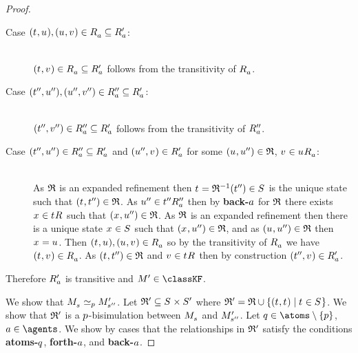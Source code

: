 \begin{proof}
\begin{description}
    \item[Case $(\kStateT, \kStateU), (\kStateU, \kStateV) \in \kAccessibilityA \subseteq \kAccessibilityPA$:] \hfill\\
        $(\kStateT, \kStateV) \in \kAccessibilityA \subseteq \kAccessibilityPA$ follows from the transitivity of $\kAccessibilityA$.
    \item[Case $({t}^{\prime\prime}, {u}^{\prime\prime}), ({u}^{\prime\prime}, {v}^{\prime\prime}) \in {R^{\prime\prime}_{a}} \subseteq {R^{\prime}_{a}}$:] \hfill\\
        $({t}^{\prime\prime}, {v}^{\prime\prime}) \in {R^{\prime\prime}_{a}} \subseteq {R^{\prime}_{a}}$ follows from the transitivity of ${R^{\prime\prime}_{a}}$.
    \item[Case $({t}^{\prime\prime}, {u}^{\prime\prime}) \in {R^{\prime\prime}_{a}} \subseteq {R^{\prime}_{a}}$ and $(\kStateUPP, \kStateV) \in \kAccessibilityPA$ for some $(\kStateU, \kStateUPP) \in \refinement$, $\kStateV \in \kSuccessorsA{\kStateU}$:] \hfill\\
        As $\mathfrak{R}$ is an expanded refinement then $\kStateT = \refinement^{-1}(\kStateTPP) \in \kStates$ is the unique state such that $(\kStateT, \kStateTPP) \in \refinement$.
        As ${u}^{\prime\prime} \in {{t}^{\prime\prime}} {R^{\prime\prime}_{a}}$ then by {\bf back-$a$} for $\mathfrak{R}$ there exists $\kStateX \in \kSuccessors{}{\kStateT}$ such that $(\kStateX, \kStateUPP) \in \refinement$.
        As $\mathfrak{R}$ is an expanded refinement then there is a unique state $\kStateX \in \kStates$ such that $(\kStateX, \kStateUPP) \in \refinement$, and as $(\kStateU, \kStateUPP) \in \refinement$ then $\kStateX = \kStateU$.
        Then $(\kStateT, \kStateU), (\kStateU, \kStateV) \in \kAccessibilityA$ so by the transitivity of $\kAccessibilityA$ we have $(\kStateT, \kStateV) \in \kAccessibilityA$.
        As $(\kStateT, \kStateTPP) \in \refinement$ and $\kStateV \in \kSuccessors{}{\kStateT}$ then by construction $(\kStateTPP, \kStateV) \in \kAccessibilityPA$.
\end{description}

Therefore ${R^{\prime}_{a}}$ is transitive and $\kModelP \in \classKF$.

We show that $\kPModel{\kStateS} \bisimilar[\atomP] \kPModelP{\kStateSPP}$.
Let $\bisimulation' \subseteq \kStates \times \kStatesP$ where $\bisimulation' = \refinement \cup \{(\kStateT, \kStateT) \mid \kStateT \in \kStates\}$.
We show that $\mathfrak{R}'$ is a $p$-bisimulation between $\kPModel{\kStateS}$ and ${M^{\prime}_{{s}^{\prime\prime}}}$.
Let $\atomQ \in \atoms \setminus \{\atomP\}$, $\agentA \in \agents$.
We show by cases that the relationships in $\mathfrak{R}'$ satisfy the conditions {\bf atoms-$q$}, {\bf forth-$a$}, and {\bf back-$a$}.


\end{proof}
